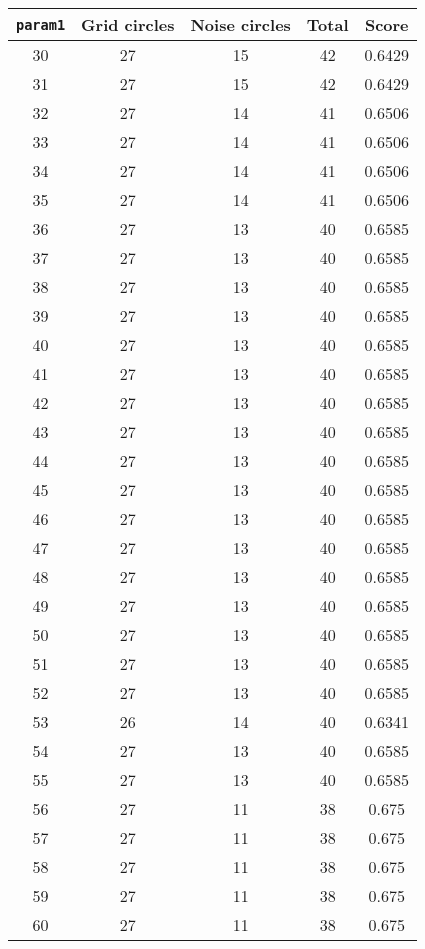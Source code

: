 \documentclass[letterpaper, 12pt]{article}
\begin{document}
\begin{longtable}{|c|c|c|c|c|}
\hline
\textbf{\texttt{param1}} & \textbf{Grid circles} & \textbf{Noise circles} & \textbf{Total} & \textbf{Score} \\
\hline
30 & 27 & 15 & 42 & 0.6429 \\
\hline
31 & 27 & 15 & 42 & 0.6429 \\
\hline
32 & 27 & 14 & 41 & 0.6506 \\
\hline
33 & 27 & 14 & 41 & 0.6506 \\
\hline
34 & 27 & 14 & 41 & 0.6506 \\
\hline
35 & 27 & 14 & 41 & 0.6506 \\
\hline
36 & 27 & 13 & 40 & 0.6585 \\
\hline
37 & 27 & 13 & 40 & 0.6585 \\
\hline
38 & 27 & 13 & 40 & 0.6585 \\
\hline
39 & 27 & 13 & 40 & 0.6585 \\
\hline
40 & 27 & 13 & 40 & 0.6585 \\
\hline
41 & 27 & 13 & 40 & 0.6585 \\
\hline
42 & 27 & 13 & 40 & 0.6585 \\
\hline
43 & 27 & 13 & 40 & 0.6585 \\
\hline
44 & 27 & 13 & 40 & 0.6585 \\
\hline
45 & 27 & 13 & 40 & 0.6585 \\
\hline
46 & 27 & 13 & 40 & 0.6585 \\
\hline
47 & 27 & 13 & 40 & 0.6585 \\
\hline
48 & 27 & 13 & 40 & 0.6585 \\
\hline
49 & 27 & 13 & 40 & 0.6585 \\
\hline
50 & 27 & 13 & 40 & 0.6585 \\
\hline
51 & 27 & 13 & 40 & 0.6585 \\
\hline
52 & 27 & 13 & 40 & 0.6585 \\
\hline
53 & 26 & 14 & 40 & 0.6341 \\
\hline
54 & 27 & 13 & 40 & 0.6585 \\
\hline
55 & 27 & 13 & 40 & 0.6585 \\
\hline
56 & 27 & 11 & 38 & 0.675 \\
\hline
57 & 27 & 11 & 38 & 0.675 \\
\hline
58 & 27 & 11 & 38 & 0.675 \\
\hline
59 & 27 & 11 & 38 & 0.675 \\
\hline
60 & 27 & 11 & 38 & 0.675 \\

\end{longtable}
\end{document}
